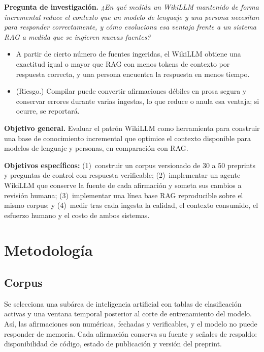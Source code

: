 \documentclass[11pt,letterpaper]{article}
\begin{document}
\noindent\textbf{Pregunta de investigación.} \textit{¿En qué medida un WikiLLM mantenido de forma
incremental reduce el contexto que un modelo de lenguaje y una persona necesitan para responder
correctamente, y cómo evoluciona esa ventaja frente a un sistema RAG a medida que se ingieren
nuevas fuentes?}

\begin{itemize}[leftmargin=2.4em]
\item[H1.] A partir de cierto número de fuentes ingeridas, el WikiLLM obtiene una exactitud igual
o mayor que RAG con menos tokens de contexto por respuesta correcta, y una persona encuentra la
respuesta en menos tiempo.
\item[H2.] (Riesgo.) Compilar puede convertir afirmaciones débiles en prosa segura y conservar
errores durante varias ingestas, lo que reduce o anula esa ventaja; si ocurre, se reportará.
\end{itemize}

\noindent\textbf{Objetivo general.} Evaluar el patrón WikiLLM como herramienta para construir una
base de conocimiento incremental que optimice el contexto disponible para modelos de lenguaje y
personas, en comparación con RAG.

\textbf{Objetivos específicos:} (1)~construir un corpus versionado de 30 a 50 preprints y
preguntas de control con respuesta verificable; (2)~implementar un agente WikiLLM que conserve la
fuente de cada afirmación y someta sus cambios a revisión humana; (3)~implementar una línea base
RAG reproducible sobre el mismo corpus; y (4)~medir tras cada ingesta la calidad, el contexto
consumido, el esfuerzo humano y el costo de ambos sistemas.

\section{Metodología}

\subsection{Corpus}
Se selecciona una subárea de inteligencia artificial con tablas de clasificación activas y una
ventana temporal posterior al corte de entrenamiento del modelo. Así, las afirmaciones son
numéricas, fechadas y verificables, y el modelo no puede responder de memoria. Cada afirmación conserva su fuente y señales
de respaldo: disponibilidad de código, estado de publicación y versión del preprint.
\end{document}
